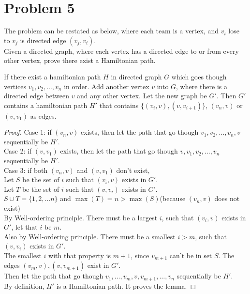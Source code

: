\documentclass[letter]{article}
\begin{document}
\section*{Problem 5}

The problem can be restated as below, where each team is a vertex, and $v_i$ lose to $v_j$ is directed edge $(v_j,v_i)$.\\
Given a directed graph, where each vertex has a directed edge to or from every other vertex, prove there exist a Hamiltonian path.\\

\begin{lma}
If there exist a hamiltonian path $H$ in directed graph $G$ which goes though vertices $v_1,v_2, \ldots, v_n$ in order. Add another vertex $v$ into $G$, where there is a directed edge between $v$ and any other vertex. Let the new graph be $G'$. Then $G'$ contains a hamiltonian path $H'$ that contains $\{(v_i, v), (v, v_{i+1})\}$, $(v_n, v)$ or $(v, v_1)$ as edges.
\end{lma}
\begin{proof}
Case 1: if $(v_n,v)$ exists, then let the path that go though $v_1, v_2, \ldots, v_n, v$ sequentially be $H'$.\\
Case 2: if $(v,v_1)$ exists, then let the path that go though $v, v_1, v_2, \ldots, v_n$ sequentially be $H'$.\\
Case 3: if both $(v_n,v)$ and $(v,v_1)$ don't exist,\\
Let $S$ be the set of $i$ such that $(v_i,v)$ exists in $G'$.\\
Let $T$ be the set of $i$ such that $(v,v_i)$ exists in $G'$.\\
$S \cup T = \{1,2,\ldots n\}$ and $\max(T)=n>\max(S)$(because $(v_n,v)$ does not exist)\\
By Well-ordering principle. There must be a largest $i$, such that $(v_i, v)$ exists in $G'$, let that $i$ be $m$.\\
Also by Well-ordering principle. There must be a smallest $i>m$, such that $(v, v_i)$ exists in $G'$.\\
The smallest $i$ with that property is $m+1$, since $v_{m+1}$ can't be in set $S$. The edges $(v_m, v), (v,v_{m+1})$ exist in $G'$.\\
Then let the path that go though $v_1, \ldots, v_m, v, v_{m+1},\ldots, v_n$ sequentially be $H'$.\\
By definition, $H'$ is a Hamiltonian path. It proves the lemma.
\end{proof}
\end{document}
